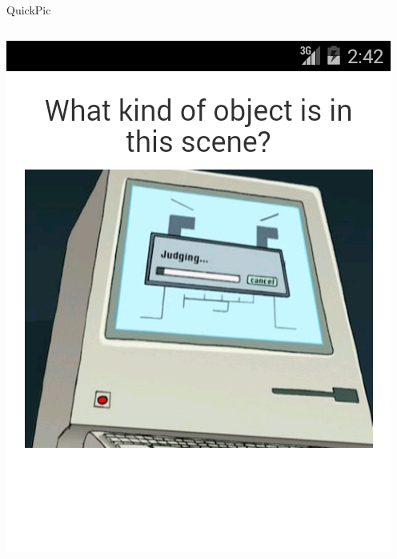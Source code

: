 \documentclass[aspectratio=169]{beamer}
\begin{document}
\begin{frame}{QuickPic}
  \begin{columns}[c]
    \begin{column}{0.5\columnwidth}
      \includegraphics[width=\columnwidth]{ss_quickpic_image}
    \end{column}
    \begin{column}{0.5\columnwidth}

\end{column}
\end{columns}
\end{frame}
\end{document}
